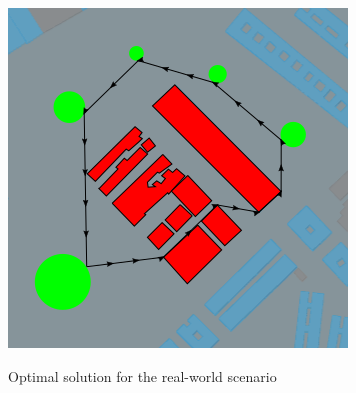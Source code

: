 \documentclass[a4paper,  review, authoryear, 1p.]{elsarticle}
\begin{document}
{\begin{figure}
\begin{minipage}{0.3\linewidth}
				\label{fig:realworld2}
			\end{minipage}
			\begin{minipage}{0.3\linewidth}
				\centering
				\caption{Optimal solution for the real-world scenario}
				\includegraphics[width=1\linewidth]{figures/example_solution}
				\label{fig:realworld3}
			\end{minipage}
		\end{figure}
		
	}
	
	
\end{document}
